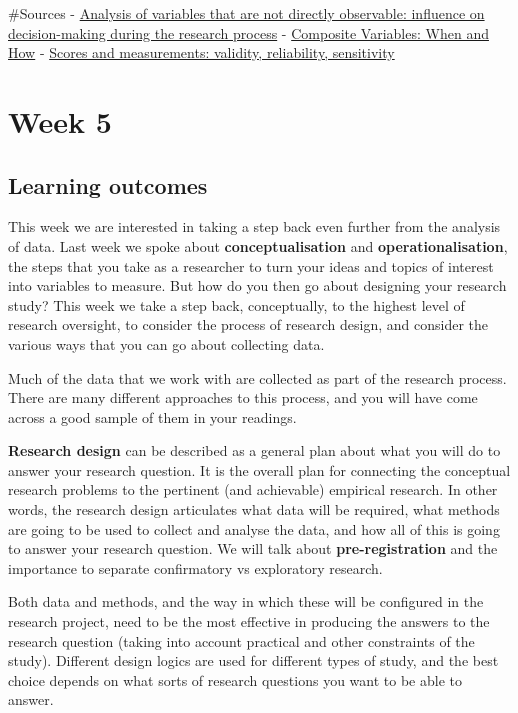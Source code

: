 \documentclass[
]{book}
\begin{document}
\#Sources
- \href{http://www.scielo.br/scielo.php?script=sci_arttext\&pid=S0080-62342014000100146}{Analysis of variables that are not directly observable: influence on decision-making during the research process}
- \href{https://www.ncbi.nlm.nih.gov/pmc/articles/PMC5459482/}{Composite Variables: When and How}
- \href{http://onlinelibrary.wiley.com.manchester.idm.oclc.org/doi/10.1002/9780470024522.ch4/pdf}{Scores and measurements: validity, reliability, sensitivity}

\hypertarget{week5}{%
\chapter{Week 5}\label{week5}}

\hypertarget{learning-outcomes-4}{%
\section{Learning outcomes}\label{learning-outcomes-4}}

This week we are interested in taking a step back even further from the analysis of data. Last week we spoke about \textbf{conceptualisation} and \textbf{operationalisation}, the steps that you take as a researcher to turn your ideas and topics of interest into variables to measure. But how do you then go about designing your research study? This week we take a step back, conceptually, to the highest level of research oversight, to consider the process of research design, and consider the various ways that you can go about collecting data.

Much of the data that we work with are collected as part of the research process. There are many different approaches to this process, and you will have come across a good sample of them in your readings.

\textbf{Research design} can be described as a general plan about what you will do to answer your research question. It is the overall plan for connecting the conceptual research problems to the pertinent (and achievable) empirical research. In other words, the research design articulates what data will be required, what methods are going to be used to collect and analyse the data, and how all of this is going to answer your research question. We will talk about \textbf{pre-registration} and
the importance to separate confirmatory vs exploratory research.

Both data and methods, and the way in which these will be configured in the research project, need to be the most effective in producing the answers to the research question (taking into account practical and other constraints of the study). Different design logics are used for different types of study, and the best choice depends on what sorts of research questions you want to be able to answer.
\end{document}
